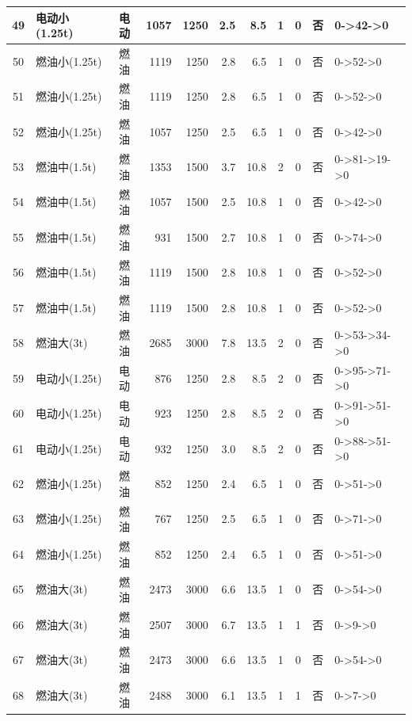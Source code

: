 \begin{landscape}
\begin{longtable}{|c|l|c|r|r|r|r|c|c|c|p{2.8cm}|}
\hline
\rowcolor{gray!8}
49 & 电动小(1.25t) & 电动 & 1057 & 1250 & 2.5 & 8.5 & 1 & 0 & 否 & 0->42->0 \\
\hline
50 & 燃油小(1.25t) & 燃油 & 1119 & 1250 & 2.8 & 6.5 & 1 & 0 & 否 & 0->52->0 \\
\hline
\rowcolor{gray!8}
51 & 燃油小(1.25t) & 燃油 & 1119 & 1250 & 2.8 & 6.5 & 1 & 0 & 否 & 0->52->0 \\
\hline
52 & 燃油小(1.25t) & 燃油 & 1057 & 1250 & 2.5 & 6.5 & 1 & 0 & 否 & 0->42->0 \\
\hline
\rowcolor{gray!8}
53 & 燃油中(1.5t) & 燃油 & 1353 & 1500 & 3.7 & 10.8 & 2 & 0 & 否 & 0->81->19->0 \\
\hline
54 & 燃油中(1.5t) & 燃油 & 1057 & 1500 & 2.5 & 10.8 & 1 & 0 & 否 & 0->42->0 \\
\hline
\rowcolor{gray!8}
55 & 燃油中(1.5t) & 燃油 & 931 & 1500 & 2.7 & 10.8 & 1 & 0 & 否 & 0->74->0 \\
\hline
56 & 燃油中(1.5t) & 燃油 & 1119 & 1500 & 2.8 & 10.8 & 1 & 0 & 否 & 0->52->0 \\
\hline
\rowcolor{gray!8}
57 & 燃油中(1.5t) & 燃油 & 1119 & 1500 & 2.8 & 10.8 & 1 & 0 & 否 & 0->52->0 \\
\hline
58 & 燃油大(3t) & 燃油 & 2685 & 3000 & 7.8 & 13.5 & 2 & 0 & 否 & 0->53->34->0 \\
\hline
\rowcolor{gray!8}
59 & 电动小(1.25t) & 电动 & 876 & 1250 & 2.8 & 8.5 & 2 & 0 & 否 & 0->95->71->0 \\
\hline
60 & 电动小(1.25t) & 电动 & 923 & 1250 & 2.8 & 8.5 & 2 & 0 & 否 & 0->91->51->0 \\
\hline
\rowcolor{gray!8}
61 & 电动小(1.25t) & 电动 & 932 & 1250 & 3.0 & 8.5 & 2 & 0 & 否 & 0->88->51->0 \\
\hline
62 & 燃油小(1.25t) & 燃油 & 852 & 1250 & 2.4 & 6.5 & 1 & 0 & 否 & 0->51->0 \\
\hline
\rowcolor{gray!8}
63 & 燃油小(1.25t) & 燃油 & 767 & 1250 & 2.5 & 6.5 & 1 & 0 & 否 & 0->71->0 \\
\hline
64 & 燃油小(1.25t) & 燃油 & 852 & 1250 & 2.4 & 6.5 & 1 & 0 & 否 & 0->51->0 \\
\hline
\rowcolor{gray!8}
65 & 燃油大(3t) & 燃油 & 2473 & 3000 & 6.6 & 13.5 & 1 & 0 & 否 & 0->54->0 \\
\hline
66 & 燃油大(3t) & 燃油 & 2507 & 3000 & 6.7 & 13.5 & 1 & 1 & 否 & 0->9->0 \\
\hline
\rowcolor{gray!8}
67 & 燃油大(3t) & 燃油 & 2473 & 3000 & 6.6 & 13.5 & 1 & 0 & 否 & 0->54->0 \\
\hline
68 & 燃油大(3t) & 燃油 & 2488 & 3000 & 6.1 & 13.5 & 1 & 1 & 否 & 0->7->0 \\

\end{longtable}
\end{landscape}
